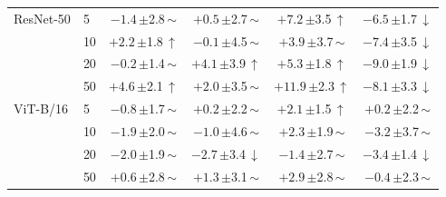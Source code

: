 \begin{table}[htbp]
\begin{tabular}{llcccc}
ResNet-50 & 5 & $-1.4$\,{\scriptsize$\pm$2.8}\,$\sim$ & $+0.5$\,{\scriptsize$\pm$2.7}\,$\sim$ & $+7.2$\,{\scriptsize$\pm$3.5}\,$\uparrow$ & $-6.5$\,{\scriptsize$\pm$1.7}\,$\downarrow$ \\
 & 10 & $+2.2$\,{\scriptsize$\pm$1.8}\,$\uparrow$ & $-0.1$\,{\scriptsize$\pm$4.5}\,$\sim$ & $+3.9$\,{\scriptsize$\pm$3.7}\,$\sim$ & $-7.4$\,{\scriptsize$\pm$3.5}\,$\downarrow$ \\
 & 20 & $-0.2$\,{\scriptsize$\pm$1.4}\,$\sim$ & $+4.1$\,{\scriptsize$\pm$3.9}\,$\uparrow$ & $+5.3$\,{\scriptsize$\pm$1.8}\,$\uparrow$ & $-9.0$\,{\scriptsize$\pm$1.9}\,$\downarrow$ \\
 & 50 & $+4.6$\,{\scriptsize$\pm$2.1}\,$\uparrow$ & $+2.0$\,{\scriptsize$\pm$3.5}\,$\sim$ & $+11.9$\,{\scriptsize$\pm$2.3}\,$\uparrow$ & $-8.1$\,{\scriptsize$\pm$3.3}\,$\downarrow$ \\
\addlinespace[2pt]
ViT-B/16 & 5 & $-0.8$\,{\scriptsize$\pm$1.7}\,$\sim$ & $+0.2$\,{\scriptsize$\pm$2.2}\,$\sim$ & $+2.1$\,{\scriptsize$\pm$1.5}\,$\uparrow$ & $+0.2$\,{\scriptsize$\pm$2.2}\,$\sim$ \\
 & 10 & $-1.9$\,{\scriptsize$\pm$2.0}\,$\sim$ & $-1.0$\,{\scriptsize$\pm$4.6}\,$\sim$ & $+2.3$\,{\scriptsize$\pm$1.9}\,$\sim$ & $-3.2$\,{\scriptsize$\pm$3.7}\,$\sim$ \\
 & 20 & $-2.0$\,{\scriptsize$\pm$1.9}\,$\sim$ & $-2.7$\,{\scriptsize$\pm$3.4}\,$\downarrow$ & $-1.4$\,{\scriptsize$\pm$2.7}\,$\sim$ & $-3.4$\,{\scriptsize$\pm$1.4}\,$\downarrow$ \\
 & 50 & $+0.6$\,{\scriptsize$\pm$2.8}\,$\sim$ & $+1.3$\,{\scriptsize$\pm$3.1}\,$\sim$ & $+2.9$\,{\scriptsize$\pm$2.8}\,$\sim$ & $-0.4$\,{\scriptsize$\pm$2.3}\,$\sim$ \\
\bottomrule
\end{tabular}
\end{table}

